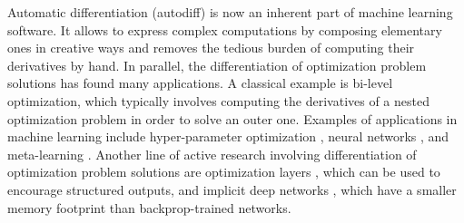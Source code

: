 \documentclass{article}
\begin{document}
Automatic differentiation (autodiff) is now an inherent part of machine
learning software.  It allows to express complex computations by composing
elementary ones in creative ways and removes the tedious burden of computing
their derivatives by hand. In parallel, the differentiation of optimization
problem solutions has found many applications. A classical example is bi-level
optimization, which typically involves computing the derivatives of a nested
optimization problem in order to solve an outer one.
Examples of applications in machine learning include hyper-parameter
optimization \cite{chapelle_2002,seeger_2008,pedregosa2016hyperparameter,
franceschi_2017, bertrand_2020_implicit,bertrand_2021_journal},
neural networks \cite{lorraine_2020}, and
meta-learning \cite{franceschi_2018,meta_learning}. Another line of active
research involving differentiation of optimization problem solutions
are optimization layers
\cite{kim_2017,amos_2017,niculae_2017,djolonga_2017,
gould_2019}, which can be used to encourage structured outputs, and implicit
deep networks \cite{bai_2019,el_ghaoui_2019,fung2021fixed,geng_2021,ramzi_2021}, which have a smaller memory
footprint than backprop-trained networks.
\end{document}

